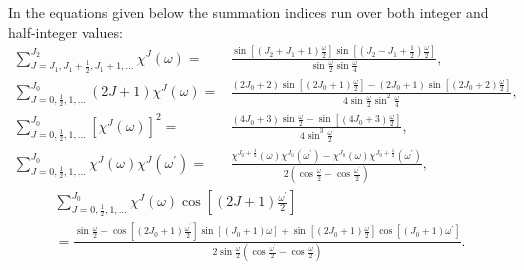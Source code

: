 In the equations given below the summation indices run over both integer and half-integer values:
\begin{align}
\sum_{J=J_{1}, J_{1}+\frac{1}{2}, J_{1}+1, \ldots}^{J_{2}} \chi^{J}(\omega)=&\frac{\sin \left[\left(J_{2}+J_{1}+1\right) \frac{\omega}{2}\right] \sin \left[\left(J_{2}-J_{1}+\frac{1}{2}\right) \frac{\omega}{2}\right]}{\sin \frac{\omega}{2} \sin \frac{\omega}{4}},  \label{eq:4:14:47}\\
\sum_{J=0, \frac{1}{2}, 1, \ldots}^{J_{0}}(2 J+1) \chi^{J}(\omega)=&\frac{\left(2 J_{0}+2\right) \sin \left[\left(2 J_{0}+1\right) \frac{\omega}{2}\right]-\left(2 J_{0}+1\right) \sin \left[\left(2 J_{0}+2\right) \frac{\omega}{2}\right]}{4 \sin \frac{\omega}{2} \sin ^{2} \frac{\omega}{4}},  \label{eq:4:14:48}\\
\sum_{J=0, \frac{1}{2}, 1, \ldots}^{J_{0}}\left[\chi^{J}(\omega)\right]^{2}=&\frac{\left(4 J_{0}+3\right) \sin \frac{\omega}{2}-\sin \left[\left(4 J_{0}+3\right) \frac{\omega}{2}\right]}{4 \sin ^{3} \frac{\omega}{2}},  \label{eq:4:14:49}\\
\sum_{J=0, \frac{1}{2}, 1, \ldots}^{J_{0}} \chi^{J}(\omega) \chi^{J}\left(\omega^{\prime}\right)=&\frac{\chi^{J_{0}+\frac{1}{2}}(\omega) \chi^{J_{0}}\left(\omega^{\prime}\right)-\chi^{J_{0}}(\omega) \chi^{J_{0}+\frac{1}{2}}\left(\omega^{\prime}\right)}{2\left(\cos \frac{\omega}{2}-\cos \frac{\omega^{\prime}}{2}\right)},  \label{eq:4:14:50}
\end{align}
\begin{multline}
\sum_{J=0, \frac{1}{2}, 1, \ldots}^{J_{0}} \chi^{J}(\omega) \cos \left[(2 J+1) \frac{\omega^{\prime}}{2}\right]  \\
=\frac{\sin \frac{\omega}{2}-\cos \left[\left(2 J_{0}+1\right) \frac{\omega^{\prime}}{2}\right] \sin \left[\left(J_{0}+1\right) \omega\right]+\sin \left[\left(2 J_{0}+1\right) \frac{\omega}{2}\right] \cos \left[\left(J_{0}+1\right) \omega^{\prime}\right]}{2 \sin \frac{\omega}{2}\left(\cos \frac{\omega^{\prime}}{2}-\cos \frac{\omega}{2}\right)} . \label{eq:4:14:51}
\end{multline}
